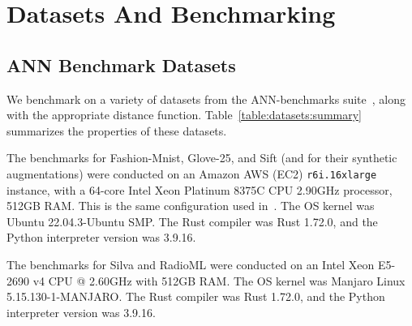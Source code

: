 
\section{Datasets And Benchmarking}
\label{sec:datasets-and-benchmarks}

\subsection{ANN Benchmark Datasets}
\label{subsec:ann-benchmarks}


We benchmark on a variety of datasets from the ANN-benchmarks suite~\cite{Aumller2018ANNBenchmarksAB}, along with the appropriate distance function.
Table~\ref{table:datasets:summary} summarizes the properties of these datasets.


The benchmarks for Fashion-Mnist, Glove-25, and Sift (and for their synthetic augmentations) were conducted on an Amazon AWS (EC2) \texttt{r6i.16xlarge} instance, with a 64-core Intel Xeon Platinum 8375C CPU 2.90GHz processor, 512GB RAM.
This is the same configuration used in~\cite{Aumller2018ANNBenchmarksAB}.
The OS kernel was Ubuntu 22.04.3-Ubuntu SMP.
The Rust compiler was Rust 1.72.0, and the Python interpreter version was 3.9.16.

The benchmarks for Silva and RadioML were conducted on an Intel Xeon E5-2690 v4 CPU @ 2.60GHz with 512GB RAM.
The OS kernel was Manjaro Linux 5.15.130-1-MANJARO.
The Rust compiler was Rust 1.72.0, and the Python interpreter version was 3.9.16.



